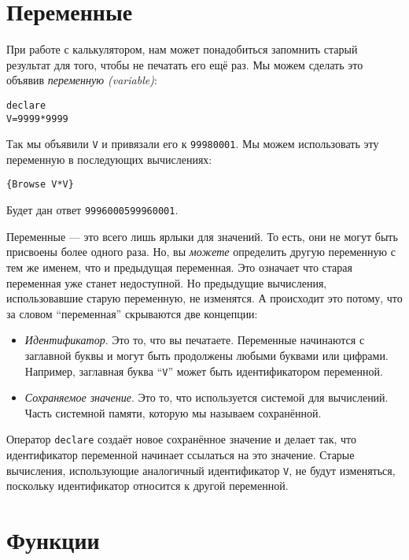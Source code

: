 \section{Переменные}

При работе с калькулятором, нам может понадобиться запомнить старый результат для того, чтобы не печатать его ещё раз. Мы можем сделать это объявив \emph{переменную (variable)}:

\begin{lstlisting}
declare
V=9999*9999
\end{lstlisting}

Так мы объявили \lstinline!V! и привязали его к \lstinline!99980001!. Мы можем использовать эту переменную в последующих вычислениях:

\begin{lstlisting}
{Browse V*V}
\end{lstlisting}

Будет дан ответ \lstinline!9996000599960001!.

Переменные --- это всего лишь ярлыки для значений. То есть, они не могут быть присвоены более одного раза. Но, вы \emph{можете} определить другую переменную с тем же именем, что и предыдущая переменная. Это означает что старая переменная уже станет недоступной. Но предыдущие вычисления, использовавшие старую переменную, не изменятся. А происходит это потому, что за словом ``переменная'' скрываются две концепции:

\begin{itemize}
\item{\emph{Идентификатор}. Это то, что вы печатаете. Переменные начинаются с заглавной буквы и могут быть продолжены любыми буквами или цифрами. Например, заглавная буква ``\lstinline!V!'' может быть идентификатором переменной.}

\item{\emph{Сохраняемое значение}. Это то, что используется системой для вычислений. Часть системной памяти, которую мы называем сохранённой.}
\end{itemize}

Оператор \lstinline!declare! создаёт новое сохранённое значение и делает так, что идентификатор переменной начинает ссылаться на это значение. Старые вычисления, использующие аналогичный идентификатор \lstinline!V!, не будут изменяться, поскольку идентификатор относится к другой переменной.

\section{Функции}

